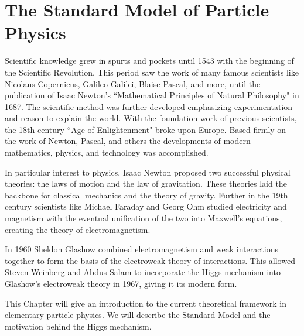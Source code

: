 
\chapter{The Standard Model of Particle Physics}


Scientific knowledge grew in spurts and pockets until 1543 with the beginning of the Scientific Revolution. This period saw the work of many famous scientists like Nicolaus Copernicus, Galileo Galilei, Blaise Pascal, and more, until the publication of Isaac Newton's ``Mathematical Principles of Natural Philosophy" in 1687. The scientific method was further developed  emphasizing experimentation and reason to explain the world. With the foundation work of previous scientists, the 18th century ``Age of Enlightenment" broke upon Europe. Based firmly on the work of Newton, Pascal, and others the developments of modern mathematics, physics, and technology was accomplished.

In particular interest to physics, Isaac Newton proposed two successful physical theories: the laws of motion and the law of gravitation. These theories laid the backbone for classical mechanics and the theory of gravity. Further in the 19th century scientists like Michael Faraday and Georg Ohm studied electricity and magnetism with the eventual unification of the two into Maxwell's equations, creating the theory of electromagnetism.  

In 1960 Sheldon Glashow combined electromagnetism and weak interactions together to form the basis of the electroweak theory of interactions.\cite{Glashow1961} This allowed Steven Weinberg and Abdus Salam to incorporate the Higgs mechanism into Glashow's electroweak theory in 1967, giving it its modern form.

This Chapter will give an introduction to the current theoretical framework in elementary particle physics.  We will describe the Standard Model and the motivation behind the Higgs mechanism.

